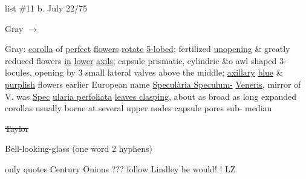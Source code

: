 \documentclass[a4paper]{article}
\begin{document}
\begin{minipage}{0.1\textwidth}
\Circled{\color{blue}{13}} 
\end{minipage}
\begin{minipage}{0.2\textwidth}
\color{blue}
\null list \#11
b. July 22/75
\end{minipage}
\begin{minipage}{0.7\textwidth}
\begin{flushright}
\color{blue}
\par
Gray
$\rightarrow$
\color{red}\Circled{\color{blue}{Venus's Looking-glass}}\par
\end{flushright}
\end{minipage}
\color{blue}
\vspace{0pt}
\begin{minipage}[t]{0.3\textwidth}
\setul{}{2pt}
Gray: \ul{corolla}
of \ul{perfect} \ul{flowers}
\ul{rotate} \ul{5-lobed};
fertilized
\ul{unopening} \&
greatly reduced
flowers \ul{in} \ul{lower}
\ul{axils}; capsule
prismatic, cylindric
\&o awl shaped 3-
locules, opening
by 3 small lateral
valves
above the
middle; \ul{axillary}
\ul{blue} \& \ul{purplish} %
flowers earlier
European name
\setul{}{1pt}
\ul{Specul\`aria Speculum-} 
\ul{Veneris}, mirror of V.
\setul{}{2pt}
was \ul{Spec}
\setul{}{1pt}
\ul{ularia perfoliata}
\setul{}{2pt}
\ul{leaves clasping}, about as
broad as long expanded
corollas usually borne
at several upper nodes
capsule pores sub-
median

\sout{Taylor}

Bell-looking-glass
(one word
2 hyphens)

only
quotes Century
Onions ???
follow Lindley
he would!
! LZ
\end{minipage}
\hfill
\end{document}
